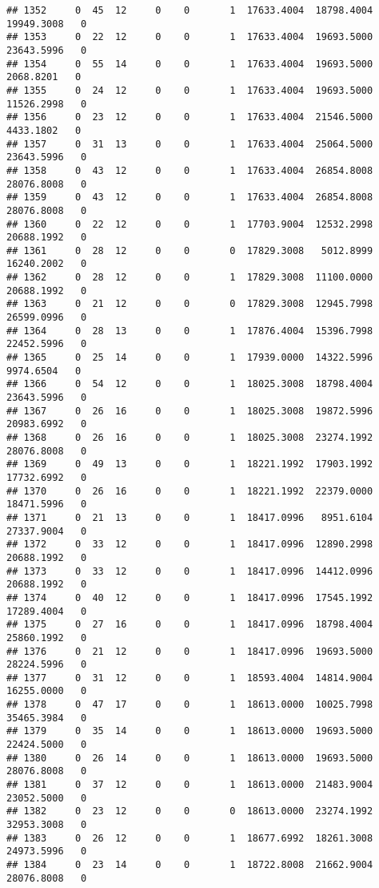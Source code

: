 \documentclass[
]{article}
\begin{document}
\begin{enumerate}
\begin{verbatim}
## 1352     0  45  12     0    0       1  17633.4004  18798.4004  19949.3008   0
## 1353     0  22  12     0    0       1  17633.4004  19693.5000  23643.5996   0
## 1354     0  55  14     0    0       1  17633.4004  19693.5000   2068.8201   0
## 1355     0  24  12     0    0       1  17633.4004  19693.5000  11526.2998   0
## 1356     0  23  12     0    0       1  17633.4004  21546.5000   4433.1802   0
## 1357     0  31  13     0    0       1  17633.4004  25064.5000  23643.5996   0
## 1358     0  43  12     0    0       1  17633.4004  26854.8008  28076.8008   0
## 1359     0  43  12     0    0       1  17633.4004  26854.8008  28076.8008   0
## 1360     0  22  12     0    0       1  17703.9004  12532.2998  20688.1992   0
## 1361     0  28  12     0    0       0  17829.3008   5012.8999  16240.2002   0
## 1362     0  28  12     0    0       1  17829.3008  11100.0000  20688.1992   0
## 1363     0  21  12     0    0       0  17829.3008  12945.7998  26599.0996   0
## 1364     0  28  13     0    0       1  17876.4004  15396.7998  22452.5996   0
## 1365     0  25  14     0    0       1  17939.0000  14322.5996   9974.6504   0
## 1366     0  54  12     0    0       1  18025.3008  18798.4004  23643.5996   0
## 1367     0  26  16     0    0       1  18025.3008  19872.5996  20983.6992   0
## 1368     0  26  16     0    0       1  18025.3008  23274.1992  28076.8008   0
## 1369     0  49  13     0    0       1  18221.1992  17903.1992  17732.6992   0
## 1370     0  26  16     0    0       1  18221.1992  22379.0000  18471.5996   0
## 1371     0  21  13     0    0       1  18417.0996   8951.6104  27337.9004   0
## 1372     0  33  12     0    0       1  18417.0996  12890.2998  20688.1992   0
## 1373     0  33  12     0    0       1  18417.0996  14412.0996  20688.1992   0
## 1374     0  40  12     0    0       1  18417.0996  17545.1992  17289.4004   0
## 1375     0  27  16     0    0       1  18417.0996  18798.4004  25860.1992   0
## 1376     0  21  12     0    0       1  18417.0996  19693.5000  28224.5996   0
## 1377     0  31  12     0    0       1  18593.4004  14814.9004  16255.0000   0
## 1378     0  47  17     0    0       1  18613.0000  10025.7998  35465.3984   0
## 1379     0  35  14     0    0       1  18613.0000  19693.5000  22424.5000   0
## 1380     0  26  14     0    0       1  18613.0000  19693.5000  28076.8008   0
## 1381     0  37  12     0    0       1  18613.0000  21483.9004  23052.5000   0
## 1382     0  23  12     0    0       0  18613.0000  23274.1992  32953.3008   0
## 1383     0  26  12     0    0       1  18677.6992  18261.3008  24973.5996   0
## 1384     0  23  14     0    0       1  18722.8008  21662.9004  28076.8008   0

\end{verbatim}
\end{enumerate}
\end{document}
